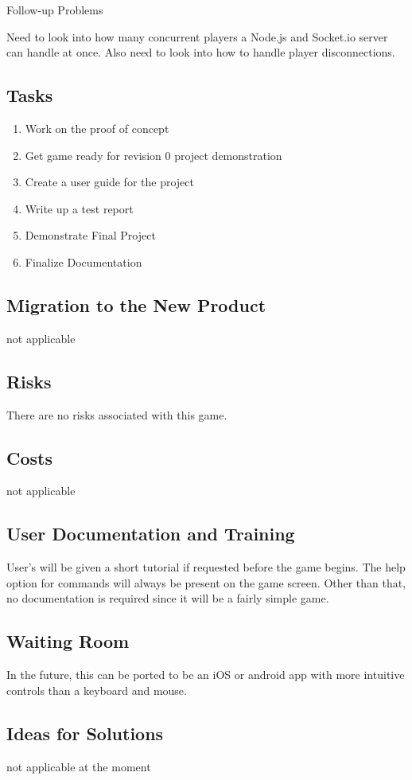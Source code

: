 \documentclass[12pt]{article}
\begin{document}
Follow-up Problems

Need to look into how many concurrent players a Node.js and Socket.io server can handle at once. Also need to look into how to handle player disconnections.
\subsection{Tasks}
\begin{enumerate}
\item Work on the proof of concept
\item Get game ready for revision 0 project demonstration
\item Create a user guide for the project
\item Write up a test report
\item Demonstrate Final Project
\item Finalize Documentation
\end{enumerate}
\subsection{Migration to the New Product}
not applicable
\subsection{Risks}
There are no risks associated with this game.
\subsection{Costs}
not applicable
\subsection{User Documentation and Training}
User’s will be given a short tutorial if requested before the game begins. The help option for commands will always be present on the game screen. Other than that, no documentation is required since it will be a fairly simple game.
\subsection{Waiting Room}
In the future, this can be ported to be an iOS or android app with more intuitive controls than a keyboard and mouse.
\subsection{Ideas for Solutions}
not applicable at the moment
\end{document}

